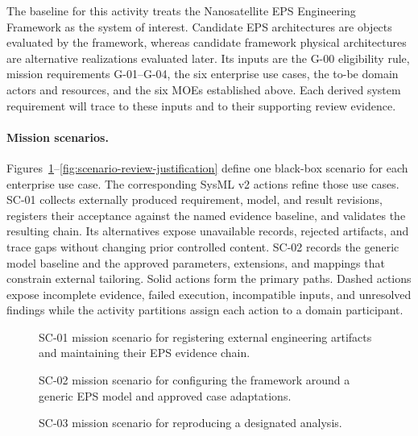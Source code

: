 \documentclass[11pt,a4paper]{article}
\begin{document}
The baseline for this activity treats the Nanosatellite EPS Engineering Framework as the system of interest. Candidate EPS architectures are objects evaluated by the framework, whereas candidate framework physical architectures are alternative realizations evaluated later. Its inputs are the G-00 eligibility rule, mission requirements G-01--G-04, the six enterprise use cases, the to-be domain actors and resources, and the six MOEs established above. Each derived system requirement will trace to these inputs and to their supporting review evidence.

\paragraph{Mission scenarios.}
Figures~\ref{fig:scenario-maintain-evidence}--\ref{fig:scenario-review-justification} define one black-box scenario for each enterprise use case. The corresponding SysML v2 actions refine those use cases. SC-01 collects externally produced requirement, model, and result revisions, registers their acceptance against the named evidence baseline, and validates the resulting chain. Its alternatives expose unavailable records, rejected artifacts, and trace gaps without changing prior controlled content. SC-02 records the generic model baseline and the approved parameters, extensions, and mappings that constrain external tailoring. Solid actions form the primary paths. Dashed actions expose incomplete evidence, failed execution, incompatible inputs, and unresolved findings while the activity partitions assign each action to a domain participant.

\begin{figure}[H]
    \centering
    \resizebox{\linewidth}{!}{}
    \caption{SC-01 mission scenario for registering external engineering artifacts and maintaining their EPS evidence chain.}
    \label{fig:scenario-maintain-evidence}
\end{figure}

\begin{figure}[H]
    \centering
    \resizebox{\linewidth}{!}{}
    \caption{SC-02 mission scenario for configuring the framework around a generic EPS model and approved case adaptations.}
    \label{fig:scenario-configure-case}
\end{figure}

\begin{figure}[H]
    \centering
    \resizebox{\linewidth}{!}{}
    \caption{SC-03 mission scenario for reproducing a designated analysis.}
    \label{fig:scenario-reproduce-analysis}
\end{figure}
\end{document}
